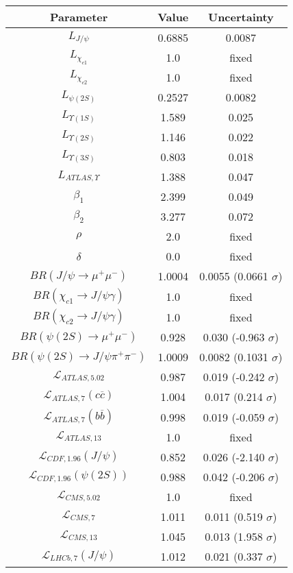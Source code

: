 \begin{table}[h!]
\centering
\begin{tabular}{c|c|c}
Parameter & Value & Uncertainty \\
\hline
$L_{J/\psi}$ & 0.6885 & 0.0087 \\
$L_{\chi_{c1}}$ & 1.0 & fixed \\
$L_{\chi_{c2}}$ & 1.0 & fixed \\
$L_{\psi(2S)}$ & 0.2527 & 0.0082 \\
$L_{\Upsilon(1S)}$ & 1.589 & 0.025 \\
$L_{\Upsilon(2S)}$ & 1.146 & 0.022 \\
$L_{\Upsilon(3S)}$ & 0.803 & 0.018 \\
$L_{ATLAS,\Upsilon}$ & 1.388 & 0.047 \\
$\beta_1$ & 2.399 & 0.049 \\
$\beta_2$ & 3.277 & 0.072 \\
$\rho$ & 2.0 & fixed \\
$\delta$ & 0.0 & fixed \\
$BR(J/\psi\rightarrow\mu^+\mu^-)$ & 1.0004 & 0.0055 (0.0661 $\sigma$) \\
$BR(\chi_{c1}\rightarrow J/\psi\gamma)$ & 1.0 & fixed \\
$BR(\chi_{c2}\rightarrow J/\psi\gamma)$ & 1.0 & fixed \\
$BR(\psi(2S)\rightarrow\mu^+\mu^-)$ & 0.928 & 0.030 (-0.963 $\sigma$) \\
$BR(\psi(2S)\rightarrow J/\psi\pi^+\pi^-)$ & 1.0009 & 0.0082 (0.1031 $\sigma$) \\
$\mathcal L_{ATLAS,5.02}$ & 0.987 & 0.019 (-0.242 $\sigma$) \\
$\mathcal L_{ATLAS,7}(c\overline c)$ & 1.004 & 0.017 (0.214 $\sigma$) \\
$\mathcal L_{ATLAS,7}(b\overline b)$ & 0.998 & 0.019 (-0.059 $\sigma$) \\
$\mathcal L_{ATLAS,13}$ & 1.0 & fixed \\
$\mathcal L_{CDF,1.96}(J/\psi)$ & 0.852 & 0.026 (-2.140 $\sigma$) \\
$\mathcal L_{CDF,1.96}(\psi(2S))$ & 0.988 & 0.042 (-0.206 $\sigma$) \\
$\mathcal L_{CMS,5.02}$ & 1.0 & fixed \\
$\mathcal L_{CMS,7}$ & 1.011 & 0.011 (0.519 $\sigma$) \\
$\mathcal L_{CMS,13}$ & 1.045 & 0.013 (1.958 $\sigma$) \\
$\mathcal L_{LHCb,7}(J/\psi)$ & 1.012 & 0.021 (0.337 $\sigma$) \\

\end{tabular}
\end{table}

